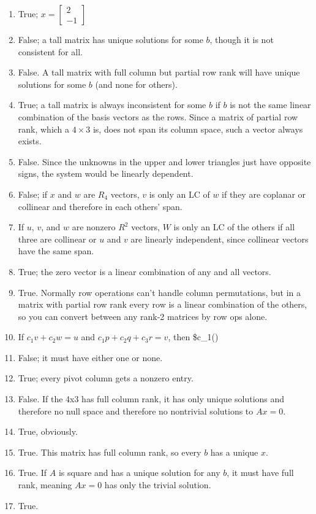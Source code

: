 \documentclass[]{article}
\begin{document}
\begin{enumerate}
\def\labelenumi{\arabic{enumi}.}
\setcounter{enumi}{19}
\item
  True; \(x=\begin{bmatrix}2\\-1\end{bmatrix}\)
\item
  False; a tall matrix has unique solutions for some \(b\), though it is
  not consistent for all.
\item
  False. A tall matrix with full column but partial row rank will have
  unique solutions for some \(b\) (and none for others).
\item
  True; a tall matrix is always inconsistent for some \(b\) if \(b\) is
  not the same linear combination of the basis vectors as the rows.
  Since a matrix of partial row rank, which a \(4\times{3}\) is, does
  not span its column space, such a vector always exists.
\item
  False. Since the unknowns in the upper and lower triangles just have
  opposite signs, the system would be linearly dependent.
\item
  False; if \(x\) and \(w\) are \(R_4\) vectors, \(v\) is only an LC of
  \(w\) if they are coplanar or collinear and therefore in each others'
  span.
\item
  If \(u\), \(v\), and \(w\) are nonzero \(R^2\) vectors, \(W\) is only
  an LC of the others if all three are collinear or \(u\) and \(v\) are
  linearly independent, since collinear vectors have the same span.
\item
  True; the zero vector is a linear combination of any and all vectors.
\item
  True. Normally row operations can't handle column permutations, but in
  a matrix with partial row rank every row is a linear combination of
  the others, so you can convert between any rank-2 matrices by row ops
  alone.
\item
  If \(c_1v+c_2w=u\) and \(c_1p+c_2q+c_3r=v\), then \$c\_1()
\item
  False; it must have either one or none.
\item
  True; every pivot column gets a nonzero entry.
\item
  False. If the 4x3 has full column rank, it has only unique solutions
  and therefore no null space and therefore no nontrivial solutions to
  \(Ax=0\).
\item
  True, obviously.
\item
  True. This matrix has full column rank, so every \(b\) has a unique
  \(x\).
\item
  True. If \(A\) is square and has a unique solution for any \(b\), it
  must have full rank, meaning \(Ax=0\) has only the trivial solution.
\item
  True.
\end{enumerate}
\end{document}
